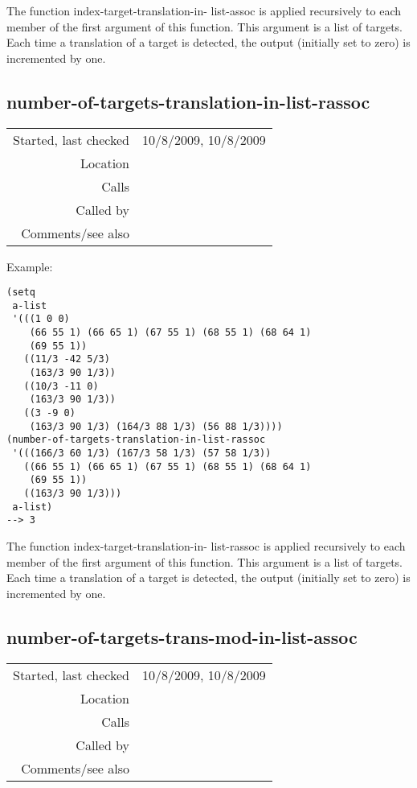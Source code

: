 \noindent The function index-target-translation-in-
list-assoc is applied recursively to each member of
the first argument of this function. This argument is
a list of targets. Each time a translation of a target
is detected, the output (initially set to zero) is
incremented by one.


\subsection*{number-of-targets-translation-in-list-rassoc}\label{fun:number-of-targets-translation-in-list-rassoc}

\vspace{0.3cm}
\begin{tabular}{r|p{8cm}}
Started, last checked & 10/8/2009, 10/8/2009 \\
Location & \nameref{sec:evaluation-for-SIA+} \\
Calls & \nameref{fun:index-target-translation-in-list-rassoc} \\
Called by & \\
Comments/see also &
\end{tabular}

\vspace{0.5cm}
\noindent Example:
\begin{verbatim}
(setq
 a-list
 '(((1 0 0)
    (66 55 1) (66 65 1) (67 55 1) (68 55 1) (68 64 1)
    (69 55 1))
   ((11/3 -42 5/3)
    (163/3 90 1/3))
   ((10/3 -11 0)
    (163/3 90 1/3))
   ((3 -9 0)
    (163/3 90 1/3) (164/3 88 1/3) (56 88 1/3))))
(number-of-targets-translation-in-list-rassoc
 '(((166/3 60 1/3) (167/3 58 1/3) (57 58 1/3))
   ((66 55 1) (66 65 1) (67 55 1) (68 55 1) (68 64 1)
    (69 55 1))
   ((163/3 90 1/3)))
 a-list)
--> 3
\end{verbatim}

\noindent The function index-target-translation-in-
list-rassoc is applied recursively to each member of
the first argument of this function. This argument is
a list of targets. Each time a translation of a target
is detected, the output (initially set to zero) is
incremented by one.


\subsection*{number-of-targets-trans-mod-in-list-assoc}\label{fun:number-of-targets-trans-mod-in-list-assoc}

\vspace{0.3cm}
\begin{tabular}{r|p{8cm}}
Started, last checked & 10/8/2009, 10/8/2009 \\
Location & \nameref{sec:evaluation-for-SIA+} \\
Calls & \nameref{fun:index-target-translation-mod-in-list-assoc} \\
Called by & \\
Comments/see also &
\end{tabular}

